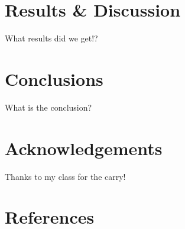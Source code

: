 \documentclass[a4paper,11pt]{extarticle}
\begin{document}
\section{Results \& Discussion}
What results did we get!?

\section{Conclusions}
What is the conclusion?

\section{Acknowledgements}
Thanks to my class for the carry!

\section{References}
\begingroup
\def\section*#1{}


\endgroup



\pagebreak
\begin{appendices}

  \setcounter{figure}{0}
  \setcounter{table}{0}
  \setcounter{equation}{0}

  \renewcommand\thefigure{\thesection.\arabic{figure}}
  \renewcommand\thetable{\thesection.\arabic{table}}
  \renewcommand\theequation{\thesection.\arabic{equation}}

\end{appendices}
\end{document}
